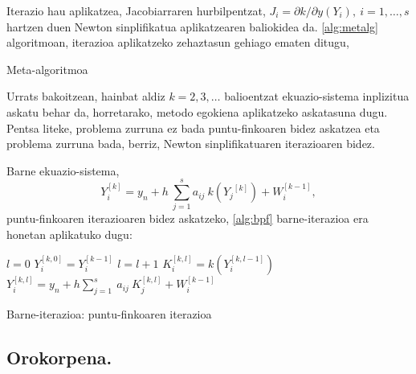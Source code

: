 Iterazio hau aplikatzea, Jacobiarraren hurbilpentzat, $J_i=\partial k/ \partial y (Y_i), \ i=1,\dots,s$ hartzen duen Newton sinplifikatua aplikatzearen baliokidea da. \ref{alg:metalg} algoritmoan, iterazioa aplikatzeko zehaztasun gehiago ematen ditugu,
 
\begin{algorithm}[H]
 \caption{Meta-algoritmoa}
 \label{alg:metalg}
\end{algorithm}

Urrats bakoitzean, hainbat aldiz $k=2,3,\dots$ balioentzat ekuazio-sistema inplizitua askatu behar da, horretarako, 
metodo egokiena aplikatzeko askatasuna dugu. Pentsa liteke,  problema zurruna ez bada puntu-finkoaren bidez askatzea eta problema zurruna bada, berriz,  Newton sinplifikatuaren iterazioaren bidez.

Barne ekuazio-sistema,
\begin{equation*}
 Y_i^{[k]}=y_n+h\  \sum^s_{j=1}{a_{ij}\ k({Y_j}^{[k]})+W^{[k-1]}_i},
\end{equation*}
puntu-finkoaren iterazioaren bidez askatzeko, \ref{alg:bpf} barne-iterazioa era honetan aplikatuko dugu: 

\begin{algorithm}[H]
 \BlankLine
  $l=0$\;
  $Y_{i}^{[k,0]}=Y_{i}^{[k-1]}$\;
  {
   \BlankLine
   $l=l+1$\;  
   \BlankLine
   $K_{i}^{[k,l]}=k(Y_{i}^{[k,l-1]})$\;
   $Y_{i}^{[k,l]}=y_{n} + h \sum\limits_{j=1}^{s} \ a_{ij} \ K_{j}^{[k,l]}  +  W_{i}^{[k-1]} $\;
  }
 \caption{Barne-iterazioa: puntu-finkoaren iterazioa}
 \label{alg:bpf}
\end{algorithm}

\subsection*{Orokorpena.}

